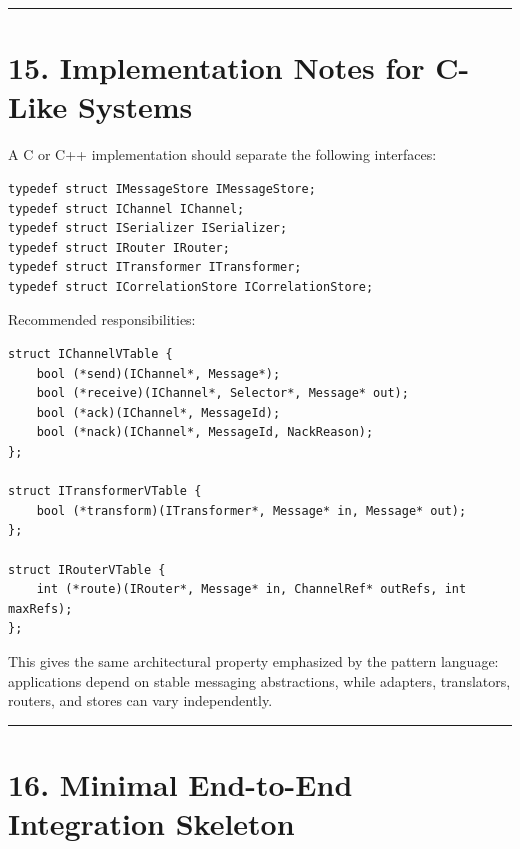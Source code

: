 \documentclass[11pt]{article}
\begin{document}
\begin{center}\rule{0.5\linewidth}{0.5pt}\end{center}

\section{15. Implementation Notes for C-Like
Systems}\label{implementation-notes-for-c-like-systems}

A C or C++ implementation should separate the following interfaces:

\begin{verbatim}
typedef struct IMessageStore IMessageStore;
typedef struct IChannel IChannel;
typedef struct ISerializer ISerializer;
typedef struct IRouter IRouter;
typedef struct ITransformer ITransformer;
typedef struct ICorrelationStore ICorrelationStore;
\end{verbatim}

Recommended responsibilities:

\begin{verbatim}
struct IChannelVTable {
    bool (*send)(IChannel*, Message*);
    bool (*receive)(IChannel*, Selector*, Message* out);
    bool (*ack)(IChannel*, MessageId);
    bool (*nack)(IChannel*, MessageId, NackReason);
};

struct ITransformerVTable {
    bool (*transform)(ITransformer*, Message* in, Message* out);
};

struct IRouterVTable {
    int (*route)(IRouter*, Message* in, ChannelRef* outRefs, int maxRefs);
};
\end{verbatim}

This gives the same architectural property emphasized by the pattern
language: applications depend on stable messaging abstractions, while
adapters, translators, routers, and stores can vary independently.

\begin{center}\rule{0.5\linewidth}{0.5pt}\end{center}

\section{16. Minimal End-to-End Integration
Skeleton}\label{minimal-end-to-end-integration-skeleton}
\end{document}
